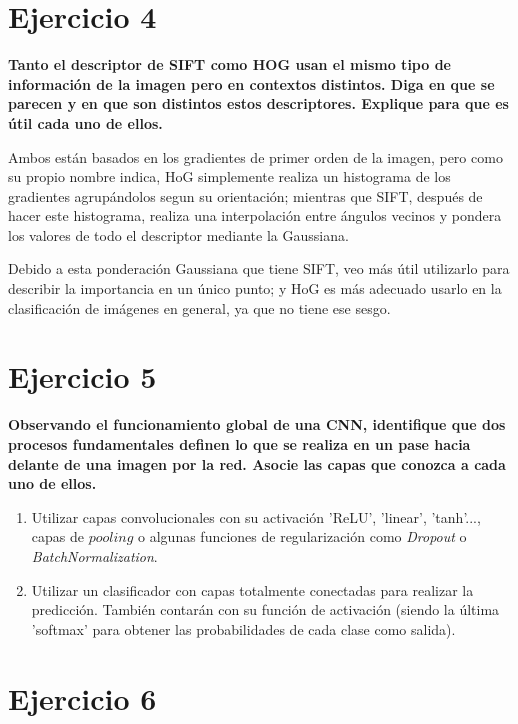 \documentclass[11pt,a4paper]{article}
\begin{document}
\section*{Ejercicio 4}

\textbf{Tanto el descriptor de SIFT como HOG usan el mismo tipo de información de la imagen pero en contextos distintos. Diga en que se parecen y en que son
distintos estos descriptores. Explique para que es útil cada uno de ellos.}

Ambos están basados en los gradientes de primer orden de la imagen, pero como su propio nombre indica, HoG simplemente realiza un histograma de los gradientes
agrupándolos segun su orientación; mientras que SIFT, después de hacer este histograma, realiza una interpolación entre ángulos vecinos y pondera los valores
de todo el descriptor mediante la Gaussiana.

Debido a esta ponderación Gaussiana que tiene SIFT, veo más útil utilizarlo para describir la importancia en un único punto; y HoG es más adecuado usarlo en
la clasificación de imágenes en general, ya que no tiene ese sesgo.


\section*{Ejercicio 5}

\textbf{Observando el funcionamiento global de una CNN, identifique que dos procesos fundamentales definen lo que se realiza en un pase hacia delante de una
imagen por la red. Asocie las capas que conozca a cada uno de ellos.}

\begin{enumerate}
    \item Utilizar capas convolucionales con su activación 'ReLU', 'linear', 'tanh'..., capas de $pooling$ o algunas funciones de regularización como
          \textit{Dropout} o \textit{BatchNormalization}.
    \item Utilizar un clasificador con capas totalmente conectadas para realizar la predicción. También contarán con su función de activación (siendo la
          última 'softmax' para obtener las probabilidades de cada clase como salida).
\end{enumerate}



\section*{Ejercicio 6}
\end{document}
